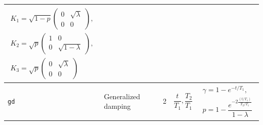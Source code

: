 \documentclass[11pt]{article}
\begin{document}
\begin{longtable}{|p{1.2cm}|p{2.5cm}|p{1cm}|p{2cm}|p{8cm}|}
{\begin{gather}
K_{1} = \sqrt{1-p}\begin{pmatrix}0 & \sqrt{\lambda} \\ 0 & 0\end{pmatrix}, \nonumber \\
K_{2} = \sqrt{p}\begin{pmatrix}1 & 0 \\ 0 & \sqrt{1 - \lambda}\end{pmatrix}, \nonumber \\
K_{3} = \sqrt{p}\begin{pmatrix}0 & \sqrt{\lambda} \\ 0 & 0\end{pmatrix}  \label{gd}
\end{gather}} \\
\hline
\texttt{gd} & Generalized damping & 2 & $\dfrac{t}{T_{1}}, \dfrac{T_{2}}{T_{1}}$ &
\parbox{5cm}{\begin{gather}
\gamma = 1 - e^{-t/T_{1}}, \nonumber \\
p = 1 - \dfrac{e^{-2 \frac{(t/T_{1})}{T_{2}/T_{1}}}}{1 - \lambda} \label{gdt}
\end{gather}}


\end{longtable}
\end{document}
